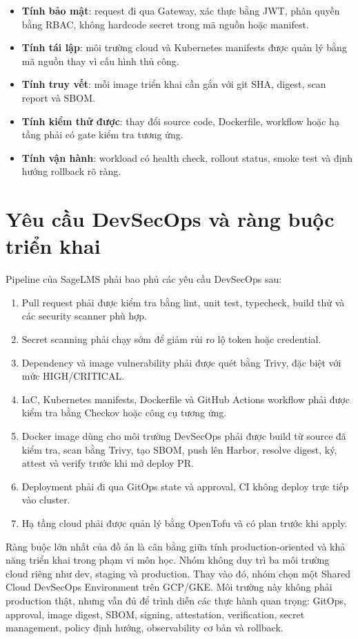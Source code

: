 \begin{itemize}
  \item \textbf{Tính bảo mật}: request đi qua Gateway, xác thực bằng JWT, phân quyền bằng RBAC, không hardcode secret trong mã nguồn hoặc manifest.
  \item \textbf{Tính tái lập}: môi trường cloud và Kubernetes manifests được quản lý bằng mã nguồn thay vì cấu hình thủ công.
  \item \textbf{Tính truy vết}: mỗi image triển khai cần gắn với git SHA, digest, scan report và SBOM.
  \item \textbf{Tính kiểm thử được}: thay đổi source code, Dockerfile, workflow hoặc hạ tầng phải có gate kiểm tra tương ứng.
  \item \textbf{Tính vận hành}: workload có health check, rollout status, smoke test và định hướng rollback rõ ràng.
\end{itemize}

\section{Yêu cầu DevSecOps và ràng buộc triển khai}

Pipeline của SageLMS phải bao phủ các yêu cầu DevSecOps sau:

\begin{enumerate}
  \item Pull request phải được kiểm tra bằng lint, unit test, typecheck, build thử và các security scanner phù hợp.
  \item Secret scanning phải chạy sớm để giảm rủi ro lộ token hoặc credential.
  \item Dependency và image vulnerability phải được quét bằng Trivy, đặc biệt với mức HIGH/CRITICAL.
  \item IaC, Kubernetes manifests, Dockerfile và GitHub Actions workflow phải được kiểm tra bằng Checkov hoặc công cụ tương ứng.
  \item Docker image dùng cho môi trường DevSecOps phải được build từ source đã kiểm tra, scan bằng Trivy, tạo SBOM, push lên Harbor, resolve digest, ký, attest và verify trước khi mở deploy PR.
  \item Deployment phải đi qua GitOps state và approval, CI không deploy trực tiếp vào cluster.
  \item Hạ tầng cloud phải được quản lý bằng OpenTofu và có plan trước khi apply.
\end{enumerate}

Ràng buộc lớn nhất của đồ án là cân bằng giữa tính production-oriented và khả năng triển khai trong phạm vi môn học. Nhóm không duy trì ba môi trường cloud riêng như dev, staging và production. Thay vào đó, nhóm chọn một Shared Cloud DevSecOps Environment trên GCP/GKE. Môi trường này không phải production thật, nhưng vẫn đủ để trình diễn các thực hành quan trọng: GitOps, approval, image digest, SBOM, signing, attestation, verification, secret management, policy định hướng, observability cơ bản và rollback.

